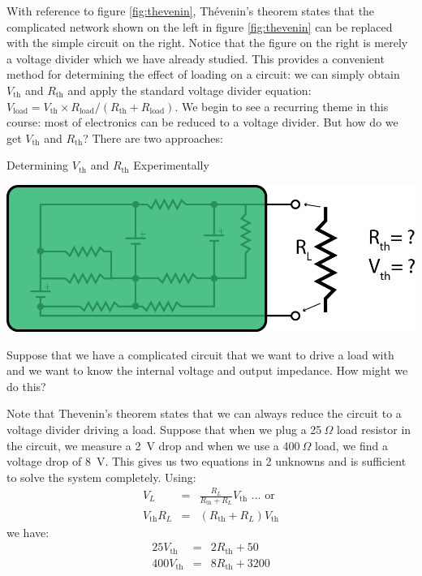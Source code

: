 \documentclass{tufte-book}
\begin{document}
With reference to figure \ref{fig:thevenin}, Th\'evenin's theorem states that the complicated network shown on the left in figure \ref{fig:thevenin} can be replaced with the simple circuit on the right. Notice that the figure on the right is merely a voltage divider which we have already studied. This provides a convenient method for determining the effect of loading on a circuit: we can simply obtain $V_\text{th}$ and $R_\text{th}$ and apply the standard voltage divider equation: $V_\text{load} = V_\text{th}\times R_\text{load}/(R_\text{th}+R_\text{load})$. We begin to see a recurring theme in this course: most of electronics can be reduced to a voltage divider. But how do we get $V_\text{th}$ and $R_\text{th}$? There are two approaches:

\begin{myexample}[label = ex:det_thev_exp]{Determining $V_\text{th}$ and $R_\text{th}$ Experimentally}

{\centering
     \includegraphics{thvn_ex_1.png}
      \par
}

Suppose that we have a complicated circuit that we want to drive a load with and we want to know the internal voltage and output impedance. How might we do this?

\noindent Note that Thevenin's theorem states that we can always reduce the circuit to a voltage divider driving a load. Suppose that when we plug a 25$~\Omega$ load resistor in the circuit, we measure a 2~V drop and when we use a 400$~\Omega$ load, we find a voltage drop of 8~V. This gives us two equations in 2 unknowns and is sufficient to solve the system completely. Using:
\begin{eqnarray*}
V_L & = &  \frac{R_L}{R_\text{th} + R_L}V_\text{th}\text{             ... or} \\
V_\text{th} R_L &=& \left(R_\text{th} + R_L\right)V_\text{th}
\end{eqnarray*}
\noindent we have:
\begin{eqnarray*}
25V_\text{th} &=& 2R_\text{th} + 50 \\
400V_\text{th} &=& 8R_\text{th} + 3200
\end{eqnarray*}


\end{myexample}
\end{document}
